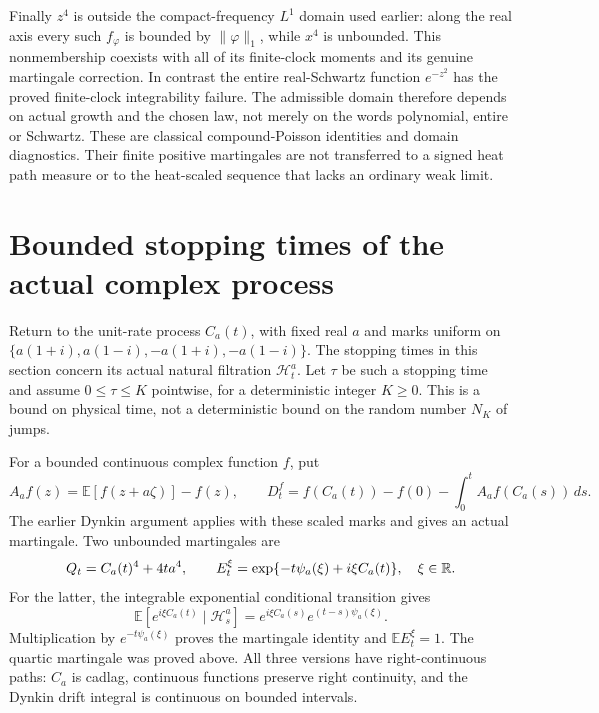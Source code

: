 \documentclass[11pt]{article}
\newcommand{\E}{\mathbb E}\newcommand{\Pp}{\mathbb P}
\begin{document}
Finally $z^4$ is outside the compact-frequency $L^1$ domain
used earlier: along the real axis every such $f_\varphi$ is bounded
by $\|\varphi\|_1$, while $x^4$ is unbounded. This nonmembership
coexists with all of its finite-clock moments and its genuine
martingale correction. In contrast the entire real-Schwartz
function $e^{-z^2}$ has the proved finite-clock integrability
failure. The admissible domain therefore depends on actual growth
and the chosen law, not merely on the words polynomial, entire or
Schwartz. These are classical compound-Poisson identities and
domain diagnostics. Their finite positive martingales are not
transferred to a signed heat path measure or to the heat-scaled
sequence that lacks an ordinary weak limit.


\section{Bounded stopping times of the actual complex process}
Return to the unit-rate process $C_a(t)$, with fixed real $a$ and
marks uniform on $\{a(1+i),a(1-i),-a(1+i),-a(1-i)\}$.
The stopping times in this section concern its actual natural
filtration $\mathcal H_t^a$. Let $\tau$ be such a stopping time and
assume $0\leq\tau\leq K$ pointwise, for a deterministic integer
$K\geq0$. This is a bound on physical time, not a deterministic bound
on the random number $N_K$ of jumps.

For a bounded continuous complex function $f$, put
\[
 A_af(z)=\E[f(z+a\zeta)]-f(z),\qquad
 D_t^f=f(C_a(t))-f(0)-\int_0^t A_af(C_a(s))\,ds.
\]
The earlier Dynkin argument applies with these scaled marks and gives
an actual martingale. Two unbounded martingales are
\[
 Q_t=C_a(t)^4+4ta^4,\qquad
 E_t^\xi=\exp\{-t\psi_a(\xi)+i\xi C_a(t)\},\quad \xi\in\mathbb R.
\]
For the latter, the integrable exponential conditional transition gives
\[
 \E[e^{i\xi C_a(t)}\mid\mathcal H_s^a]
   =e^{i\xi C_a(s)}e^{(t-s)\psi_a(\xi)}.
\]
Multiplication by $e^{-t\psi_a(\xi)}$ proves the martingale identity
and $\E E_t^\xi=1$. The quartic martingale was proved above.
All three versions have right-continuous paths: $C_a$ is cadlag,
continuous functions preserve right continuity, and the Dynkin drift
integral is continuous on bounded intervals.
\end{document}
